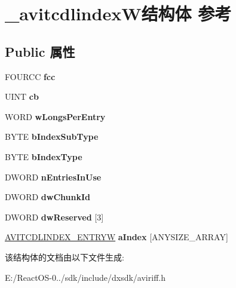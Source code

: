 \hypertarget{struct__avitcdlindex_w}{}\section{\+\_\+avitcdlindex\+W结构体 参考}
\label{struct__avitcdlindex_w}
\subsection*{Public 属性}
\begin{DoxyCompactItemize}
\item 
\mbox{\label{struct__avitcdlindex_w_a6404eb357ae47df1e591399d166e0c53}} 
F\+O\+U\+R\+CC {\bfseries fcc}
\item 
\mbox{\label{struct__avitcdlindex_w_a6ccbcc0870ec0da76bf1c02324f7840b}} 
U\+I\+NT {\bfseries cb}
\item 
\mbox{\label{struct__avitcdlindex_w_adddaa5c373ecebb3658ebc46abe1343c}} 
W\+O\+RD {\bfseries w\+Longs\+Per\+Entry}
\item 
\mbox{\label{struct__avitcdlindex_w_ad8552fd9ba97f90abde3422a71f0a9ee}} 
B\+Y\+TE {\bfseries b\+Index\+Sub\+Type}
\item 
\mbox{\label{struct__avitcdlindex_w_ab80527ae2d4da0e5b79bd0bcf560e035}} 
B\+Y\+TE {\bfseries b\+Index\+Type}
\item 
\mbox{\label{struct__avitcdlindex_w_a4d4ff3f333fe075214a588f082715e18}} 
D\+W\+O\+RD {\bfseries n\+Entries\+In\+Use}
\item 
\mbox{\label{struct__avitcdlindex_w_aed548c93bf9d4850e93f9d713a901da8}} 
D\+W\+O\+RD {\bfseries dw\+Chunk\+Id}
\item 
\mbox{\label{struct__avitcdlindex_w_a648a8dc23fcaecfb10254438a8b95b4d}} 
D\+W\+O\+RD {\bfseries dw\+Reserved} \mbox{[}3\mbox{]}
\item 
\mbox{\label{struct__avitcdlindex_w_afc7607d002544feb5948436f61b413b5}} 
\hyperlink{struct__avitcdlindex__entry_w}{A\+V\+I\+T\+C\+D\+L\+I\+N\+D\+E\+X\+\_\+\+E\+N\+T\+R\+YW} {\bfseries a\+Index} \mbox{[}A\+N\+Y\+S\+I\+Z\+E\+\_\+\+A\+R\+R\+AY\mbox{]}
\end{DoxyCompactItemize}


该结构体的文档由以下文件生成\+:\begin{DoxyCompactItemize}
\item 
E\+:/\+React\+O\+S-\/0../sdk/include/dxsdk/aviriff.\+h\end{DoxyCompactItemize}
